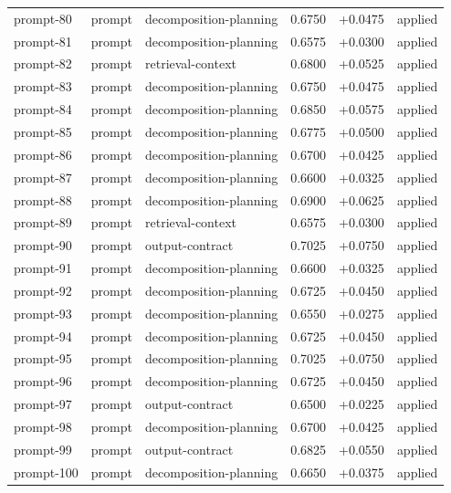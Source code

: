 \begin{center}
\begin{longtable}{llp{5.2cm}rrl}
prompt-80 & prompt & decomposition-planning & 0.6750 & +0.0475 & applied \\
prompt-81 & prompt & decomposition-planning & 0.6575 & +0.0300 & applied \\
prompt-82 & prompt & retrieval-context & 0.6800 & +0.0525 & applied \\
prompt-83 & prompt & decomposition-planning & 0.6750 & +0.0475 & applied \\
prompt-84 & prompt & decomposition-planning & 0.6850 & +0.0575 & applied \\
prompt-85 & prompt & decomposition-planning & 0.6775 & +0.0500 & applied \\
prompt-86 & prompt & decomposition-planning & 0.6700 & +0.0425 & applied \\
prompt-87 & prompt & decomposition-planning & 0.6600 & +0.0325 & applied \\
prompt-88 & prompt & decomposition-planning & 0.6900 & +0.0625 & applied \\
prompt-89 & prompt & retrieval-context & 0.6575 & +0.0300 & applied \\
prompt-90 & prompt & output-contract & 0.7025 & +0.0750 & applied \\
prompt-91 & prompt & decomposition-planning & 0.6600 & +0.0325 & applied \\
prompt-92 & prompt & decomposition-planning & 0.6725 & +0.0450 & applied \\
prompt-93 & prompt & decomposition-planning & 0.6550 & +0.0275 & applied \\
prompt-94 & prompt & decomposition-planning & 0.6725 & +0.0450 & applied \\
prompt-95 & prompt & decomposition-planning & 0.7025 & +0.0750 & applied \\
prompt-96 & prompt & decomposition-planning & 0.6725 & +0.0450 & applied \\
prompt-97 & prompt & output-contract & 0.6500 & +0.0225 & applied \\
prompt-98 & prompt & decomposition-planning & 0.6700 & +0.0425 & applied \\
prompt-99 & prompt & output-contract & 0.6825 & +0.0550 & applied \\
prompt-100 & prompt & decomposition-planning & 0.6650 & +0.0375 & applied \\
\bottomrule\end{longtable}\end{center}
\clearpage
